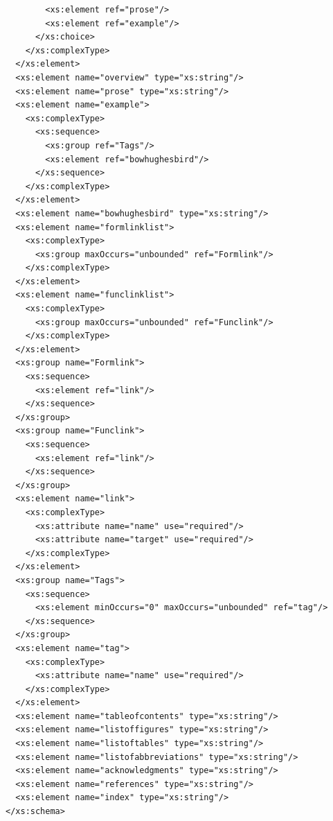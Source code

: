 \documentclass[a4paper,12pt]{article}
\begin{document}
\begin{verbatim}
        <xs:element ref="prose"/>
        <xs:element ref="example"/>
      </xs:choice>
    </xs:complexType>
  </xs:element>
  <xs:element name="overview" type="xs:string"/>
  <xs:element name="prose" type="xs:string"/>
  <xs:element name="example">
    <xs:complexType>
      <xs:sequence>
        <xs:group ref="Tags"/>
        <xs:element ref="bowhughesbird"/>
      </xs:sequence>
    </xs:complexType>
  </xs:element>
  <xs:element name="bowhughesbird" type="xs:string"/>
  <xs:element name="formlinklist">
    <xs:complexType>
      <xs:group maxOccurs="unbounded" ref="Formlink"/>
    </xs:complexType>
  </xs:element>
  <xs:element name="funclinklist">
    <xs:complexType>
      <xs:group maxOccurs="unbounded" ref="Funclink"/>
    </xs:complexType>
  </xs:element>
  <xs:group name="Formlink">
    <xs:sequence>
      <xs:element ref="link"/>
    </xs:sequence>
  </xs:group>
  <xs:group name="Funclink">
    <xs:sequence>
      <xs:element ref="link"/>
    </xs:sequence>
  </xs:group>
  <xs:element name="link">
    <xs:complexType>
      <xs:attribute name="name" use="required"/>
      <xs:attribute name="target" use="required"/>
    </xs:complexType>
  </xs:element>
  <xs:group name="Tags">
    <xs:sequence>
      <xs:element minOccurs="0" maxOccurs="unbounded" ref="tag"/>
    </xs:sequence>
  </xs:group>
  <xs:element name="tag">
    <xs:complexType>
      <xs:attribute name="name" use="required"/>
    </xs:complexType>
  </xs:element>
  <xs:element name="tableofcontents" type="xs:string"/>
  <xs:element name="listoffigures" type="xs:string"/>
  <xs:element name="listoftables" type="xs:string"/>
  <xs:element name="listofabbreviations" type="xs:string"/>
  <xs:element name="acknowledgments" type="xs:string"/>
  <xs:element name="references" type="xs:string"/>
  <xs:element name="index" type="xs:string"/>
</xs:schema>

\end{verbatim}

\normalsize
\end{document}
